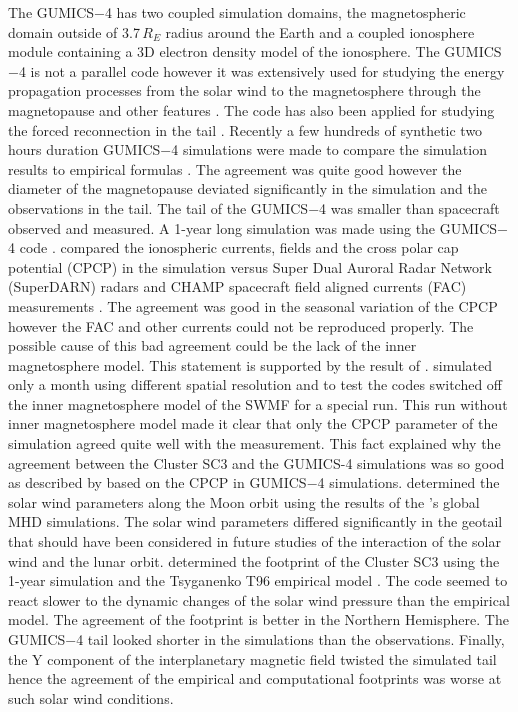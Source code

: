 \documentclass[linenumbers,draft]{agujournal}
\begin{document}
The GUMICS$-$4 has two coupled simulation domains, the magnetospheric domain outside of 3.7\,$R_E$ radius around the Earth and a coupled ionosphere module containing a 3D electron density model of the ionosphere. The GUMICS$-$4 is not a parallel code however it was extensively used for studying the energy propagation processes from the solar wind to the magnetosphere through the magnetopause and other features \citep[][see the references therein]{janhunen12:_gumic_mhd}. The code has also been applied for studying the forced reconnection in the tail \citep{voeroes14:_winds_condit_ram_co_ram}. Recently a few hundreds of synthetic two hours duration GUMICS$-$4 simulations were made to compare the simulation results to empirical formulas \citep{gordeev13:_verif_gumic_mhd}. The agreement was quite good however the diameter of the magnetopause deviated significantly in the simulation and the observations in the tail. The tail of the GUMICS$-$4 was smaller than spacecraft observed and measured. A 1-year long simulation was made using the GUMICS$-$4 code \citep{facsko16:_one_earth}. \citet{juusola14:_statis_gumic_mhd} compared the ionospheric currents, fields and the cross polar cap potential (CPCP) in the simulation versus Super Dual Auroral Radar Network (SuperDARN) radars \citep{greenwald95:_darn_super} and CHAMP spacecraft \citep{reigber02:_champ} field aligned currents (FAC) measurements \citep{juusola07:_hall_peder_champ,ritter04:_ionos_champ_image}. The agreement was good in the seasonal variation of the CPCP however the FAC and other currents could not be reproduced properly. The possible cause of this bad agreement could be the lack of the inner magnetosphere model. This statement is supported by the result of \citet{haiducek17:_swmf_global_magnet_simul_januar}. \citeauthor{haiducek17:_swmf_global_magnet_simul_januar} simulated only a month using different spatial resolution and to test the codes switched off the inner magnetosphere model of the SWMF for a special run. This run without inner magnetosphere model made it clear that only the CPCP parameter of the simulation agreed quite well with the measurement. This fact explained why the agreement between the Cluster SC3 and the GUMICS-4 simulations was so good as described by \citep{lakka18:_cross_polar_cap_satur_gumic,lakka18:_icme_earth_mach} based on the CPCP in GUMICS$-$4 simulations. \citet{kallio15:_proper} determined the solar wind parameters along the Moon orbit using the results of the \citet{facsko16:_one_earth}'s global MHD simulations. The solar wind parameters differed significantly in the geotail that should have been considered in future studies of the interaction of the solar wind and the lunar orbit. \citet{facsko16:_one_earth} determined the footprint of the Cluster SC3 using the 1-year simulation and the Tsyganenko T96 empirical model \citep{tsyganenko95:_model_earth}. The code seemed to react slower to the dynamic changes of the solar wind pressure than the empirical model. The agreement of the footprint is better in the Northern Hemisphere. The GUMICS$-$4 tail looked shorter in the simulations than the observations. Finally, the Y component of the interplanetary magnetic field twisted the simulated tail hence the agreement of the empirical and computational footprints was worse at such solar wind conditions.
\end{document}
